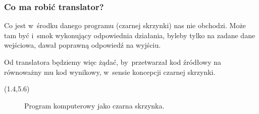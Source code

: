 \documentclass[10pt,t]{beamer}
\begin{document}
\begin{frame}
  \frametitle{Co ma robić translator?}


  Co jest w~środku danego programu (czarnej skrzynki) nas nie obchodzi.
  Może tam być i~smok wykonujący odpowiednia działania, byleby tylko
  na zadane dane wejściowa, dawał poprawną odpowiedź na wyjściu.

  Od translatora będziemy więc żądać, by~przetwarzał kod źródłowy
  na równoważny mu kod wynikowy, w~sensie koncepcji czarnej skrzynki.





  \begin{textblock}{10.1}(1.4,5.6)

    \begin{figure}

      \label{fig:Program-as-black-box-02}



      \caption{Program komputerowy jako czarna skrzynka.}


    \end{figure}

  \end{textblock}















\end{frame}
\end{document}

